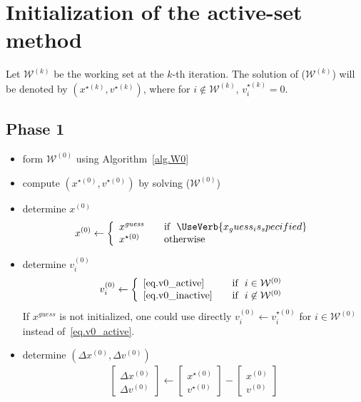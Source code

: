 \documentclass[12pt,a4paper]{article}
\begin{document}
\clearpage

\section{Initialization of the active-set method}

Let $\mathcal{W}^{(k)}$ be the working set at the $k$-th iteration. The solution of
($\mathcal{W}^{(k)}$) will be denoted by $(x^{\star(k)},v^{\star(k)})$, where for
$i\not\in \mathcal{W}^{(k)}$, $v_i^{\star(k)} = 0$.

\subsection{Phase 1}

\begin{itemize}
\item form $\mathcal{W}^{(0)}$ using Algorithm~\ref{alg.W0}
\item compute $(x^{\star(0)},v^{\star(0)})$ by solving ($\mathcal{W}^{(0)}$)
\item determine $x^{(0)}$
    \begin{align*}
      x^{(0)} \leftarrow \left\{ 
      \begin{array}{l l}
        x^{\mathit{guess}} & \quad \text{if} \,\,\,\, \UseVerb{x_guess_is_specified} \\
        x^{\star(0)} & \quad \text{otherwise}
      \end{array} \right.
    \end{align*}

\item determine $v_i^{(0)}$
%
    \begin{align*}
      v_i^{(0)} \leftarrow \left\{ 
      \begin{array}{l l}
        \eqref{eq.v0_active} & \quad \text{if} \,\,\,\, i\in\mathcal{W}^{(0)} \\
        \eqref{eq.v0_inactive} & \quad \text{if} \,\,\,\, i\not\in\mathcal{W}^{(0)}
      \end{array} \right.
    \end{align*}
    If $x^{\mathit{guess}}$ is not initialized, one could use directly $v_i^{(0)} \leftarrow v_i^{\star(0)}$
    for $i\in\mathcal{W}^{(0)}$ instead of~\eqref{eq.v0_active}.

\item determine $(\Delta x^{(0)},\Delta  v^{(0)})$
%
  \begin{align*}
    \begin{bmatrix}\Delta x^{(0)} \\ \Delta v^{(0)}\end{bmatrix} \leftarrow
    \begin{bmatrix}x^{\star(0)} \\ v^{\star(0)}\end{bmatrix} - 
    \begin{bmatrix}x^{(0)} \\ v^{(0)}\end{bmatrix}
  \end{align*}


\end{itemize}
\end{document}
